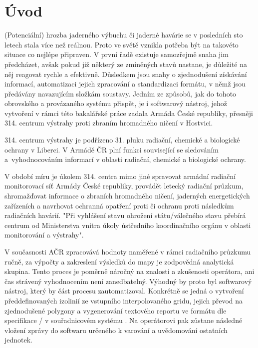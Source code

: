 \chapter{Úvod}
\label{1-uvod}

(Potenciální) hrozba jaderného výbuchu či jaderné havárie se v
posledních sto letech stala více než reálnou. Proto ve světě vznikla
potřeba být na takovéto situace co nejlépe připraven. V první řadě
existuje samozřejmě snaha jim předcházet, avšak pokud již některý ze
zmíněných stavů nastane, je důležité na něj reagovat rychle a
efektivně.  Důsledkem jsou snahy o zjednodušení získávání informací,
automatizaci jejich zpracování a standardizaci formátu, v němž jsou
předávány navazujícím složkám soustavy. Jedním ze způsobů, jak do
tohoto obrovského a provázaného systému přispět, je i softwarový
nástroj, jehož vytvoření v rámci této bakalářské práce zadala Armáda
České republiky, přesněji 314. centrum výstrahy proti zbraním
hromadného ničení v Hostvici.

314. centrum výstrahy  je podřízeno 31. pluku radiační,
chemické a bio\-logické ochrany v Liberci. V Armádě ČR plní funkci
související se sledováním a~vyhodnocováním informací v oblasti
radiační, chemické a biologické ochrany.

V období míru je úkolem 314. centra mimo jiné spravovat armádní
radiační monitorovací síť Armády České republiky, provádět letecký
radiační průzkum, shromažďovat informace o zbraních hromadného ničení,
jaderných energetických zařízeních a navrhovat ochranná opatření proti
 či ochranu proti následkům radiačních havárií. "Při vyhlášení
stavu ohrožení státu/válečného stavu přebírá centrum od Ministerstva
vnitra úkoly ústředního koordinačního orgánu v oblasti moni\-torování a
výstrahy". \cite{ZHN}

V současnosti AČR zpracovává hodnoty naměřené v rámci radiačního
průzkumu ručně, za výpočty a zakreslení výsledků do mapy je zodpovědná
analytická skupina. Tento proces je poměrně náročný na znalosti a
zkušenosti operátora, ani čas strávený vyhodnocením není
zanedbatelný. Výhodný by proto byl softwarový nástroj, který by část
procesu zautomatizoval. Konkrétně se jedná o vytvoření
předdefinovaných izolinií ze vstupního interpolovaného gridu, jejich
převod na zjednodušené polygony a vygenerování textového reportu ve
formátu dle specifikace / v souřadnicovém systému
. Na operátorovi pak zůstane následné vložení zprávy do
softwaru určeného k varování a uvědomování ostatních jednotek.


